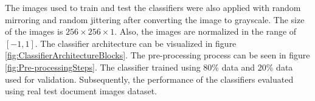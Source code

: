 The images used to train and test the classifiers were also applied with random mirroring and random jittering after converting the image to grayscale. The size of the images is $256 \times 256 \times 1$. Also, the images are normalized in the range of $[-1, 1]$. The classifier architecture can be visualized in figure \ref{fig:ClassifierArchitectureBlocks}. The pre-processing process can be seen in figure \ref{fig:Pre-processingSteps}. The classifier trained using 80\% data and 20\% data used for validation. Subsequently, the performance of the classifiers evaluated using real test document images dataset.



















































































